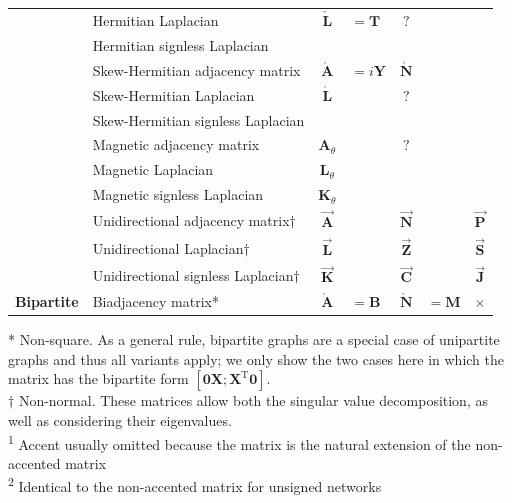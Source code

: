 \documentclass{article}
\begin{document}
\begin{table}
{\begin{tabular}{ l l c@{\;}l c@{\;}l c }
    & Hermitian Laplacian         			& $\mathbf{\check L}$&$=\mathbf T$ & $?$ \\
    & Hermitian signless Laplacian                      & & &\\
    \cmidrule(lr){2-7}
    & Skew-Hermitian adjacency matrix       		& $\mathbf{\acute A}$&$=i\mathbf Y$ & $\mathbf{\acute N}$ \\
    & Skew-Hermitian Laplacian    			& $\mathbf{\acute L}$ && $?$ \\
    & Skew-Hermitian signless Laplacian 		& & &\\
    \cmidrule(lr){2-7}
    & Magnetic adjacency matrix 			& $\mathbf A_{\theta}$  && $?$ \\
    & Magnetic Laplacian				& $\mathbf L_{\theta}$  && \\
    & Magnetic signless Laplacian			& $\mathbf K_{\theta}$  && \\
    \cmidrule(lr){2-7}
    & Unidirectional adjacency matrix$\dagger$		& $\vec{\mathbf A}$   && $\vec{\mathbf N}$ && $\vec{\mathbf P}$ \\
    & Unidirectional Laplacian$\dagger$			& $\vec{\mathbf L}$   && $\vec{\mathbf Z}$ && $\vec{\mathbf S}$ \\
    & Unidirectional signless Laplacian$\dagger$	& $\vec{\mathbf K}$   && $\vec{\mathbf C}$ && $\vec{\mathbf J}$ \\
    \midrule
    \multirow{1}{*}{\textbf{Bipartite}} 
    & Biadjacency matrix*				& $\mathbf{\grave A}$&$=\mathbf B$ & $\mathbf{\grave N}$&$=\mathbf M$ & $\times$ \\
    \bottomrule
  \end{tabular}
  }
  * Non-square. As a general rule, bipartite graphs are a special case
  of unipartite graphs and thus all variants apply; we only show the two
  cases here in which the matrix has the bipartite form $[\mathbf 0
    \mathbf X; \mathbf X^{\mathrm T} \mathbf 0]$. \\
  $\dagger$ Non-normal.  These matrices allow both the singular value
  decomposition, as well as considering their eigenvalues.  \\
  \textsuperscript{1} Accent usually omitted because the matrix is the natural extension of the non-accented matrix \\
  \textsuperscript{2} Identical to the non-accented matrix for unsigned networks 
\end{table}
\end{document}
